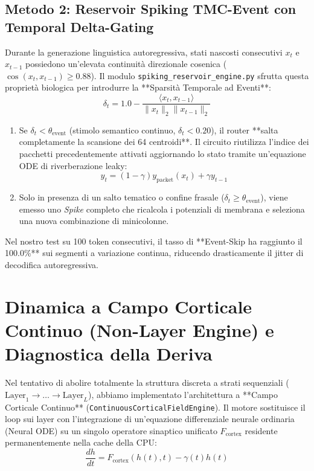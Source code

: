 \documentclass[10pt,a4paper]{article}
\theoremstyle{definition}
\begin{document}
\subsection{Metodo 2: Reservoir Spiking TMC-Event con Temporal Delta-Gating}
Durante la generazione linguistica autoregressiva, stati nascosti consecutivi $x_t$ e $x_{t-1}$ possiedono un'elevata continuità direzionale cosenica ($\cos(x_t, x_{t-1}) \ge 0.88$). Il modulo \texttt{spiking\_reservoir\_engine.py} sfrutta questa proprietà biologica per introdurre la **Sparsità Temporale ad Eventi**:
\begin{equation}
\delta_t = 1.0 - \frac{\langle x_t, x_{t-1} \rangle}{\|x_t\|_2 \|x_{t-1}\|_2}
\end{equation}
\begin{enumerate}
    \item Se $\delta_t < \theta_{\text{event}}$ (stimolo semantico continuo, $\delta_t < 0.20$), il router **salta completamente la scansione dei 64 centroidi**. Il circuito riutilizza l'indice dei pacchetti precedentemente attivati aggiornando lo stato tramite un'equazione ODE di riverberazione leaky:
    \begin{equation}
    y_t = (1 - \gamma) y_{\text{packet}}(x_t) + \gamma y_{t-1}
    \end{equation}
    \item Solo in presenza di un salto tematico o confine frasale ($\delta_t \ge \theta_{\text{event}}$), viene emesso uno \textit{Spike} completo che ricalcola i potenziali di membrana e seleziona una nuova combinazione di minicolonne.
\end{enumerate}
Nel nostro test su 100 token consecutivi, il tasso di **Event-Skip ha raggiunto il 100.0\%** sui segmenti a variazione continua, riducendo drasticamente il jitter di decodifica autoregressiva.

\bigskip

\section{Dinamica a Campo Corticale Continuo (Non-Layer Engine) e Diagnostica della Deriva}

Nel tentativo di abolire totalmente la struttura discreta a strati sequenziali ($\text{Layer}_1 \to \dots \to \text{Layer}_L$), abbiamo implementato l'architettura a **Campo Corticale Continuo** (\texttt{ContinuousCorticalFieldEngine}).
Il motore sostituisce il loop sui layer con l'integrazione di un'equazione differenziale neurale ordinaria (Neural ODE) su un singolo operatore sinaptico unificato $F_{\text{cortex}}$ residente permanentemente nella cache della CPU:
\begin{equation}
\frac{dh}{dt} = F_{\text{cortex}}(h(t), t) - \gamma(t) h(t)
\end{equation}
\end{document}
